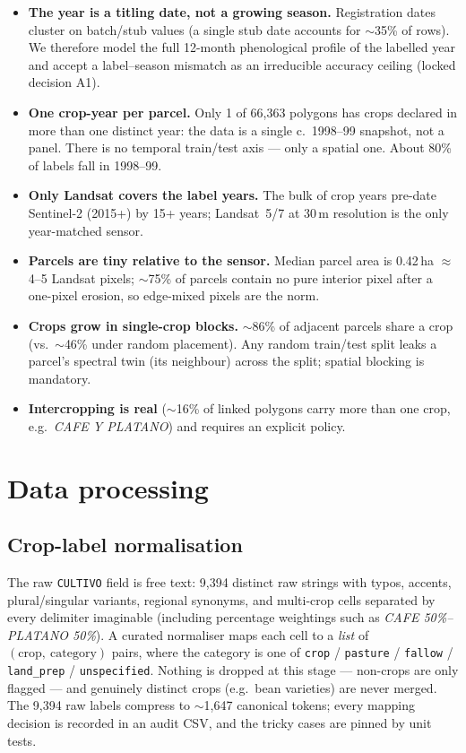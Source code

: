 \documentclass[11pt,a4paper]{article}
\begin{document}
\begin{itemize}[leftmargin=1.5em]
\item \textbf{The year is a titling date, not a growing season.} Registration dates cluster on
batch/stub values (a single stub date accounts for $\sim$35\% of rows). We therefore model the
full 12-month phenological profile of the labelled year and accept a label--season mismatch as
an irreducible accuracy ceiling (locked decision A1).
\item \textbf{One crop-year per parcel.} Only 1 of 66{,}363 polygons has crops declared in more
than one distinct year: the data is a single c.~1998--99 snapshot, not a panel. There is no
temporal train/test axis --- only a spatial one. About 80\% of labels fall in 1998--99.
\item \textbf{Only Landsat covers the label years.} The bulk of crop years pre-date Sentinel-2
(2015+) by 15+ years; Landsat~5/7 at 30\,m resolution is the only year-matched sensor.
\item \textbf{Parcels are tiny relative to the sensor.} Median parcel area is 0.42\,ha
$\approx$ 4--5 Landsat pixels; $\sim$75\% of parcels contain no pure interior pixel after a
one-pixel erosion, so edge-mixed pixels are the norm.
\item \textbf{Crops grow in single-crop blocks.} $\sim$86\% of adjacent parcels share a crop
(vs.\ $\sim$46\% under random placement). Any random train/test split leaks a parcel's
spectral twin (its neighbour) across the split; spatial blocking is mandatory.
\item \textbf{Intercropping is real} ($\sim$16\% of linked polygons carry more than one crop,
e.g.\ \emph{CAFE Y PLATANO}) and requires an explicit policy.
\end{itemize}

\section{Data processing}
\label{sec:processing}

\subsection{Crop-label normalisation}

The raw \texttt{CULTIVO} field is free text: 9{,}394 distinct raw strings with typos, accents,
plural/singular variants, regional synonyms, and multi-crop cells separated by every delimiter
imaginable (including percentage weightings such as \emph{CAFE 50\%--PLATANO 50\%}). A curated
normaliser maps each cell to a \emph{list} of $(\text{crop},\ \text{category})$ pairs, where the
category is one of \texttt{crop} / \texttt{pasture} / \texttt{fallow} / \texttt{land\_prep} /
\texttt{unspecified}. Nothing is dropped at this stage --- non-crops are only flagged --- and
genuinely distinct crops (e.g.\ bean varieties) are never merged. The 9{,}394 raw labels
compress to $\sim$1{,}647 canonical tokens; every mapping decision is recorded in an audit CSV,
and the tricky cases are pinned by unit tests.
\end{document}
